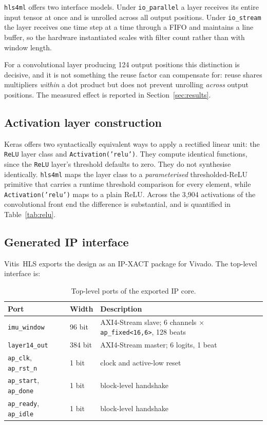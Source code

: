 \documentclass[11pt,a4paper]{article}
\begin{document}
\texttt{hls4ml} offers two interface models. Under \texttt{io\_parallel} a layer
receives its entire input tensor at once and is unrolled across all output
positions. Under \texttt{io\_stream} the layer receives one time step at a time
through a FIFO and maintains a line buffer, so the hardware instantiated scales
with filter count rather than with window length.

For a convolutional layer producing 124 output positions this distinction is
decisive, and it is not something the reuse factor can compensate for: reuse
shares multipliers \emph{within} a dot product but does not prevent unrolling
\emph{across} output positions. The measured effect is reported in
Section~\ref{sec:results}.

\subsection{Activation layer construction}

Keras offers two syntactically equivalent ways to apply a rectified linear unit:
the \texttt{ReLU} layer class and \texttt{Activation('relu')}. They compute
identical functions, since the \texttt{ReLU} layer's threshold defaults to zero.
They do not synthesise identically. \texttt{hls4ml} maps the layer class to a
\emph{parameterised} thresholded-ReLU primitive that carries a runtime threshold
comparison for every element, while \texttt{Activation('relu')} maps to a plain
ReLU. Across the 3{,}904 activations of the convolutional front end the
difference is substantial, and is quantified in Table~\ref{tab:relu}.

\subsection{Generated IP interface}

Vitis~HLS exports the design as an IP-XACT package for Vivado. The top-level
interface is:

\begin{table}[h]
\centering
\begin{tabular}{lll}
\toprule
\textbf{Port} & \textbf{Width} & \textbf{Description} \\
\midrule
\texttt{imu\_window}  & 96 bit  & AXI4-Stream slave; 6 channels $\times$
                                  \texttt{ap\_fixed<16,6>}, 128 beats \\
\texttt{layer14\_out} & 384 bit & AXI4-Stream master; 6 logits, 1 beat \\
\texttt{ap\_clk}, \texttt{ap\_rst\_n} & 1 bit & clock and active-low reset \\
\texttt{ap\_start}, \texttt{ap\_done} & 1 bit & block-level handshake \\
\texttt{ap\_ready}, \texttt{ap\_idle} & 1 bit & block-level handshake \\
\bottomrule
\end{tabular}
\caption{Top-level ports of the exported IP core.}
\end{table}
\end{document}
